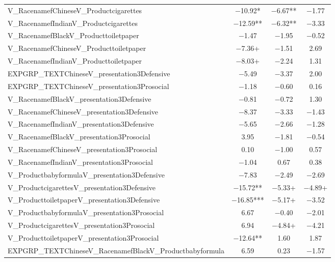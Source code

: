 \documentclass[]{report}
\begin{document}
\begin{table}
{\begin{tabular}[t]{lccc}
		V\_RacenamefChineseV\_Productcigarettes & \num{-10.92}* & \num{-6.67}** & \num{-1.77}\\
		V\_RacenamefIndianV\_Productcigarettes & \num{-12.59}** & \num{-6.32}** & \num{-3.33}\\
		V\_RacenamefBlackV\_Producttoiletpaper & \num{-1.47} & \num{-1.95} & \num{-0.52}\\
		V\_RacenamefChineseV\_Producttoiletpaper & \num{-7.36}+ & \num{-1.51} & \num{2.69}\\
		V\_RacenamefIndianV\_Producttoiletpaper & \num{-8.03}+ & \num{-2.24} & \num{1.31}\\
		EXPGRP\_TEXTChineseV\_presentation3Defensive & \num{-5.49} & \num{-3.37} & \num{2.00}\\
		EXPGRP\_TEXTChineseV\_presentation3Prosocial & \num{-1.18} & \num{-0.60} & \num{0.16}\\
		V\_RacenamefBlackV\_presentation3Defensive & \num{-0.81} & \num{-0.72} & \num{1.30}\\
		V\_RacenamefChineseV\_presentation3Defensive & \num{-8.37} & \num{-3.33} & \num{-1.43}\\
		V\_RacenamefIndianV\_presentation3Defensive & \num{-5.65} & \num{-2.66} & \num{-1.28}\\
		V\_RacenamefBlackV\_presentation3Prosocial & \num{3.95} & \num{-1.81} & \num{-0.54}\\
		V\_RacenamefChineseV\_presentation3Prosocial & \num{0.10} & \num{-1.00} & \num{0.57}\\
		V\_RacenamefIndianV\_presentation3Prosocial & \num{-1.04} & \num{0.67} & \num{0.38}\\
		V\_ProductbabyformulaV\_presentation3Defensive & \num{-7.83} & \num{-2.49} & \num{-2.69}\\
		V\_ProductcigarettesV\_presentation3Defensive & \num{-15.72}** & \num{-5.33}+ & \num{-4.89}+\\
		V\_ProducttoiletpaperV\_presentation3Defensive & \num{-16.85}*** & \num{-5.17}+ & \num{-3.52}\\
		V\_ProductbabyformulaV\_presentation3Prosocial & \num{6.67} & \num{-0.40} & \num{-2.01}\\
		V\_ProductcigarettesV\_presentation3Prosocial & \num{6.94} & \num{-4.84}+ & \num{-4.21}\\
		V\_ProducttoiletpaperV\_presentation3Prosocial & \num{-12.64}** & \num{1.60} & \num{1.87}\\
		EXPGRP\_TEXTChineseV\_RacenamefBlackV\_Productbabyformula & \num{6.59} & \num{0.23} & \num{-1.57}\\

\end{tabular}}
\end{table}
\end{document}
